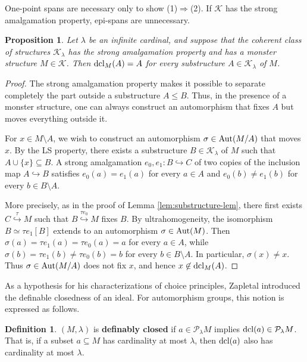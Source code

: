 \documentclass[10pt]{amsart}
\numberwithin{equation}{section}
\theoremstyle{plain}
\newtheorem{prop}[theorem]{Proposition}
\theoremstyle{definition}
\newtheorem{definition}[theorem]{Definition}
\newcommand{\K}{\mathcal{K}}
\newcommand{\embed}{\hookrightarrow}
\newcommand{\embedge}[1]{\overset{#1}{\embed}}
\begin{document}
One-point spans are necessary only to show (1)$\Rightarrow$(2).
If $\K$ has the strong amalgamation property, epi-spans are unnecessary.

\begin{prop}\label{prop:strongAP-definably-closed}
Let $\lambda$ be an infinite cardinal, and suppose that the coherent class of structures $\K_\lambda$ has the strong amalgamation property and has a monster structure $M\in\K$.
Then ${\rm dcl}_M(A)=A$ for every substructure $A\in\K_\lambda$ of $M$.
\end{prop}

\begin{proof}
The strong amalgamation property makes it possible to separate completely the part outside a substructure $A\leq B$. Thus, in the presence of a monster structure, one can always construct an automorphism that fixes $A$ but moves everything outside it.

For $x\in M\setminus A$, we wish to construct an automorphism $\sigma\in{\rm Aut}(M/A)$ that moves $x$.
By the LS property, there exists a substructure $B\in\K_\lambda$ of $M$ such that $A\cup\{x\}\subseteq B$.
A strong amalgamation $e_0,e_1\colon B\embed C$ of two copies of the inclusion map $A\embed B$ satisfies $e_0(a)=e_1(a)$ for every $a\in A$ and $e_0(b)\not=e_1(b)$ for every $b\in B\setminus A$.

More precisely, as in the proof of Lemma \ref{lem:substructure-lem}, there first exists $C\embedge{\tau} M$ such that $B\embedge{\tau e_0}M$ fixes $B$.
By ultrahomogeneity, the isomorphism $B\simeq\tau e_1[B]$ extends to an automorphism $\sigma\in{\rm Aut}(M)$.
Then $\sigma(a)=\tau e_1(a)=\tau e_0(a)=a$ for every $a\in A$, while $\sigma(b)=\tau e_1(b)\not=\tau e_0(b)=b$ for every $b\in B\setminus A$.
In particular, $\sigma(x)\not=x$.
Thus $\sigma\in{\rm Aut}(M/A)$ does not fix $x$, and hence $x\not\in{\rm dcl}_M(A)$.
\end{proof}

As a hypothesis for his characterizations of choice principles, Zapletal introduced the definable closedness of an ideal.
For automorphism groups, this notion is expressed as follows.

\begin{definition}
$(M,\lambda)$ is {\bf definably closed} if $a\in\mathcal{P}_\lambda M$ implies ${\rm dcl}(a)\in\mathcal{P}_\lambda M$.
That is, if a subset $a\subseteq M$ has cardinality at most $\lambda$, then ${\rm dcl}(a)$ also has cardinality at most $\lambda$.
\end{definition}
\end{document}
